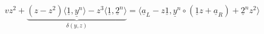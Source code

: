 \begin{appendices}
\begin{align*}
vz^2 + \underbrace{(z - z^2)\langle \underline{1}, \underline{y}^n \rangle - z^3 \langle \underline{1}, \underline{2}^n\rangle}_{\delta(y,z)} = \langle\underline{a}_L - z\underline{1}, \underline{y}^n \circ (\underline{1}z + \underline{a}_R) + \underline{2}^n z^2 \rangle
\end{align*}

\end{appendices}
